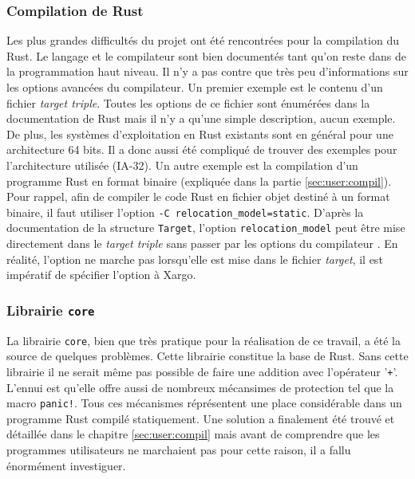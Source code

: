 \documentclass[a4paper, 12pt]{article}
\begin{document}
\subsubsection{Compilation de Rust}
Les plus grandes difficultés du projet ont été rencontrées pour la compilation
du Rust. Le langage et le compilateur sont bien documentés tant qu'on reste
dans de la programmation haut niveau. Il n'y a pas contre que très peu d'informations
sur les options avancées du compilateur. Un premier exemple est le contenu d'un
fichier \textit{target triple}. Toutes les options de ce fichier sont énumérées
dans la documentation de Rust mais il n'y a qu'une simple description, aucun exemple.
De plus, les systèmes d'exploitation en Rust existants sont en général pour une
architecture 64 bits. Il a donc aussi été compliqué de trouver des exemples pour
l'architecture utilisée (\acrshort{IA-32}). Un autre exemple est la compilation
d'un programme Rust en format binaire (expliquée dans la partie \ref{sec:user:compil}).
Pour rappel, afin de compiler le code Rust en fichier objet destiné à un format
binaire, il faut utiliser l'option \texttt{-C relocation_model=static}.
D'après la documentation de la structure \texttt{Target}, l'option
\texttt{relocation_model} peut être mise directement dans le
\textit{target triple} sans passer par les options du compilateur \cite{ref29}.
En réalité, l'option ne marche pas lorsqu'elle est mise dans le fichier \textit{target},
il est impératif de spécifier l'option à Xargo.

\subsubsection{Librairie \texttt{core}}
La librairie \texttt{core}, bien que très pratique pour la réalisation
de ce travail, a été la source de quelques problèmes. Cette librairie constitue
la base de Rust. Sans cette librairie il ne serait même pas possible de faire une
addition avec l'opérateur '\texttt{+}'. L'ennui est qu'elle offre aussi
de nombreux mécansimes de protection tel que la macro \texttt{panic!}.
Tous ces mécanismes réprésentent une place considérable dans un programme Rust
compilé statiquement. Une solution a finalement été trouvé et détaillée dans le
chapitre \ref{sec:user:compil} mais avant de comprendre que les programmes utilisateurs
ne marchaient pas pour cette raison, il a fallu énormément investiguer.
\end{document}
